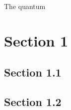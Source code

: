 \documentclass[a4paper]{article}
\begin{document}
  
 
\maketitle

{\small      
\setlength{\parindent}{0em}
\setlength{\parskip}{1em}
    The quantum
}

\tableofcontents
\newpage

\section{Section 1}
\lipsum
\subsection{Section 1.1}
\lipsum 
\lipsum
\subsection{Section 1.2}
\lipsum 
\lipsum

\nocite{qftlecture} 
\printbibliography

\immediate{}
\end{document}
